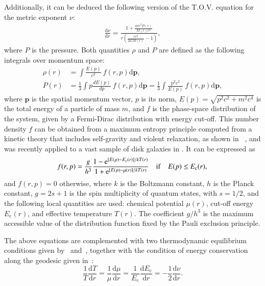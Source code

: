\documentclass[twocolumn]{aa}
\begin{document}
Additionally, it can be deduced the following version of the T.O.V. equation for the metric exponent $\nu$:
\begin{align}
   \label{tov}
    \frac{\mathrm{d}\nu}{\mathrm{d}r}= \frac{1+ \frac{\displaystyle 4\pi r^3 P(r)}{\displaystyle M(r)c^2}}{r\left(\frac{\displaystyle rc^2}{\displaystyle 2GM(r)} -1\right)},
\end{align}
where $P$ is the pressure.
Both quantities $\rho$ and $P$ are defined as the following integrals over momentum space:
\begin{align}
     \label{dens_press}
      \rho(r)&=\int \frac{E(p)}{c^2}~f(r,p)\mathrm{d}\boldsymbol{p},\\
      P(r)&=\frac{1}{3}\int p\frac{dE(p)}{dp}~f(r,p)\mathrm{d}\boldsymbol{p}=
                \frac{1}{3}\int \frac{p^2c^2}{E(p)}~f(r,p)\mathrm{d}\boldsymbol{p},
\end{align}
where $\boldsymbol{p}$ is the spatial momentum  vector, $p$ is its norm, $E(p)=\sqrt{p^2c^2+m^2c^4}$ is the total energy of a particle of mass $m$, and $f$ is the phase-space distribution of the system, given by a Fermi-Dirac distribution with energy cut-off. This number density $f$ can be obtained from a maximum entropy principle computed from a kinetic theory that includes self-gravity and violent relaxation, as shown in \citealp{2004PhyA..332...89C}~\citep[for a review see also][]{2022PhyA..60628089C}, and was recently applied to a vast sample of disk galaxies in \cite{2023ApJ...945....1K}. It can be expressed as
\begin{equation}
f(r,p)=
    \frac{g}{h^3}
      \frac{1-\mathrm{e}^{[E(p)-E_\mathrm{c}(r)]/kT(r)}}
      {1+\mathrm{e}^{[E(p)-\mu(r)]/kT(r)}}\quad\mathrm{if}\quad E(p) \leq E_\mathrm{c}(r),\\
\end{equation}
and $f(r,p)=0$ otherwise,
where $k$ is the Boltzmann constant, $h$ is the Planck constant, $g=2s+1$ is the spin multiplicity of quantum states, with $s=1/2$, and the following local quantities are used: chemical potential $\mu(r)$, cut-off energy $E_\mathrm{c}(r)$,  and effective temperature $T(r)$.
The coefficient $g/h^3$ is the maximum accessible value of the distribution function fixed by the Pauli exclusion principle.

The above equations are complemented with two thermodynamic equilibrium conditions given
by~\citet{PhysRev.35.904} and~\citet{RevModPhys.21.531}, together with the condition of energy conservation
along the geodesic given in~\citet{1989A&A...221....4M}:
\begin{equation}
    \label{tke}
   \frac{1}{T}\frac{\mathrm{d}T}{\mathrm{d}r}=\frac{1}{\mu}\frac{\mathrm{d}\mu}{\mathrm{d}r}=
   \frac{1}{E_\mathrm{c}}\frac{\mathrm{d} E_\mathrm{c}}{\mathrm{d}r}=-\frac{1}{2}\frac{\mathrm{d}\nu}{\mathrm{d}r}.
\end{equation}
\end{document}
